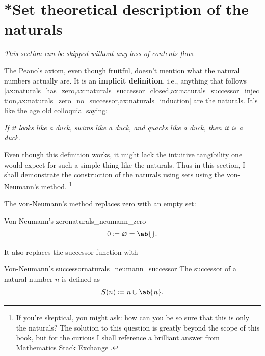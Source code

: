 \section{*Set theoretical description of the naturals}


\emph{This section can be skipped without any loss of contents flow.}

The Peano's axiom, even though fruitful, doesn't mention what the natural numbers actually are. It
is an \textbf{implicit definition}, i.e., anything that follows
\cref{ax:naturals_has_zero,ax:naturals_successor_closed,ax:naturals_successor_injection,ax:naturals_zero_no_successor,ax:naturals_induction}
are the naturals. It's like the age old colloquial saying:
\begin{displayquote}
  \emph{If it looks like a duck, swims like a duck, and quacks like a duck, then it \emph{is} a
  duck.}
\end{displayquote}

Even though this definition works, it might lack the intuitive tangibility one would expect for such
a simple thing like the naturals. Thus in this section, I shall demonstrate the construction of the
naturals using sets using the von-Neumann's method. \footnote{If you're skeptical, you might ask:
how can you be so sure that this is only the naturals? The solution to this question is greatly
beyond the scope of this book, but for the curious I shall reference a brilliant answer from
Mathematics Stack Exchange \cite{N-uniqueness}.}

The von-Neumann's method replaces zero with an empty set:

\begin{df}{Von-Neumann's zero}{naturals_neumann_zero}
  \begin{equation*}
    0 \coloneqq \varnothing = \ab\{\}.
  \end{equation*}
\end{df}

It also replaces the successor function with

\begin{df}{Von-Neumann's successor}{naturals_neumann_successor}
  The successor of a natural number \(n\) is defined as
  \begin{equation*}
    S(n) \coloneqq n \cup \ab\{n\}.
  \end{equation*}
\end{df}

